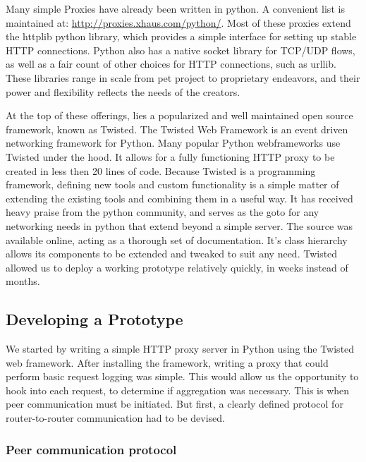 \documentclass[12pt]{article}
\begin{document}
			Many simple Proxies have already been written in python. A convenient list is maintained at: \url{http://proxies.xhaus.com/python/}. Most of these proxies extend the httplib python library, which provides a simple interface for setting up stable HTTP connections. Python also has a native socket library for TCP/UDP flows, as well as a fair count of other choices for HTTP connections, such as urllib. These libraries range in scale from pet project to proprietary endeavors, and their power and flexibility reflects the needs of the creators.
			
			At the top of these offerings, lies a popularized and well maintained open source framework, known as Twisted. The Twisted Web Framework is an event driven networking framework for Python. Many popular Python webframeworks use Twisted under the hood. It allows for a fully functioning HTTP proxy to be created in less then 20 lines of code. Because Twisted is a programming framework, defining new tools and custom functionality is a simple matter of extending the existing tools and combining them in a useful way. It has received heavy praise from the python community, and serves as the goto for any networking needs in python that extend beyond a simple server. The source was available online, acting as a thorough set of documentation. It's class hierarchy allows its components to be extended and tweaked to suit any need. Twisted allowed us to deploy a working prototype relatively quickly, in weeks instead of months.

	\subsection{Developing a Prototype}

		We started by writing a simple HTTP proxy server in Python using the Twisted web framework. After installing the framework, writing a proxy that could perform basic request logging was simple. This would allow us the opportunity to hook into each request, to determine if aggregation was necessary. This is when peer communication must be initiated. But first, a clearly defined protocol for router-to-router communication had to be devised.


		\subsubsection{Peer communication protocol}
\end{document}
